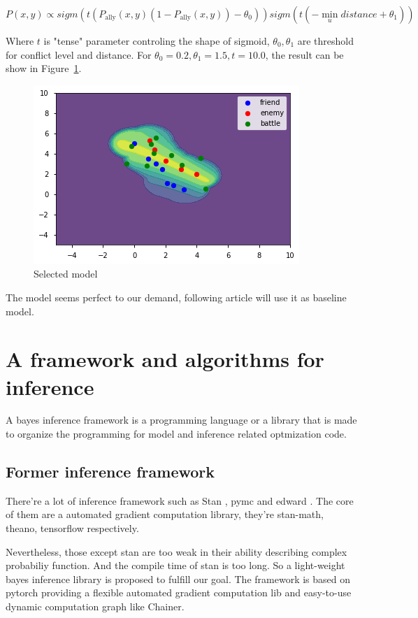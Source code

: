 \documentclass{article}
\begin{document}
$$
P(x,y) \propto sigm(t (P_\text{ally}(x,y) (1-P_\text{ally}(x,y)) - \theta_0)) sigm(t(-\min_{u} distance + \theta_1))
$$

Where $t$ is "tense" parameter controling the shape of sigmoid, $\theta_0,\theta_1$ are threshold for
conflict level and distance. For $\theta_0=0.2,\theta_1=1.5,t = 10.0$, the result can be show in Figure~\ref{fig:combSix}.

\begin{figure}[h]
\includegraphics[width=0.6\linewidth]{comb6.png}
\caption{Selected model}
\label{fig:combSix}
\end{figure}

The model seems perfect to our demand, following article will use it as baseline model.

\section{A framework and algorithms for inference}

A bayes inference framework is a programming language or a library that is made to organize the 
programming for model and inference related optmization code.

\subsection{Former inference framework}

There're a lot of inference framework such as Stan \cite{carpenter2017stan}, 
pymc\cite{patil2010pymc} and edward \cite{tran2016edward}. 
The core of them are a automated gradient computation library, 
they're stan-math, theano, tensorflow respectively. 

Nevertheless, those except stan are too weak in their ability describing complex probabiliy function.
And the compile time of stan is too long. 
So a light-weight bayes inference library is proposed to fulfill our goal. 
The framework is based on pytorch providing a flexible automated gradient computation lib and 
easy-to-use dynamic computation graph like Chainer.
\end{document}
